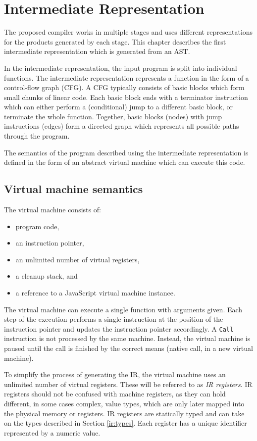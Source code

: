 \chapter{Intermediate Representation}

The proposed compiler works in multiple stages and uses different representations for the products generated by each stage. This chapter describes the first intermediate representation which is generated from an AST.

In the intermediate representation, the input program is split into individual functions. The intermediate representation represents a function in the form of a control-flow graph (CFG). A CFG typically consists of basic blocks which form small chunks of linear code. Each basic block ends with a terminator instruction which can either perform a (conditional) jump to a different basic block, or terminate the whole function. Together, basic blocks (nodes) with jump instructions (edges) form a directed graph which represents all possible paths through the program.

The semantics of the program described using the intermediate representation is defined in the form of an abstract virtual machine which can execute this code.

\section{Virtual machine semantics}

The virtual machine consists of:
\begin{itemize}
    \item program code,
    \item an instruction pointer,
    \item an unlimited number of virtual registers,
    \item a cleanup stack, and
    \item a reference to a JavaScript virtual machine instance.
\end{itemize}

The virtual machine can execute a single function with arguments given. Each step of the execution performs a single instruction at the position of the instruction pointer and updates the instruction pointer accordingly. A \texttt{Call} instruction is not processed by the same machine. Instead, the virtual machine is paused until the call is finished by the correct means (native call, in a new virtual machine).

To simplify the process of generating the IR, the virtual machine uses an unlimited number of virtual registers. These will be referred to as \textit{IR registers}. IR registers should not be confused with machine registers, as they can hold different, in some cases complex, value types, which are only later mapped into the physical memory or registers. IR registers are statically typed and can take on the types described in Section \ref{ir:types}. Each register has a unique identifier represented by a numeric value.

